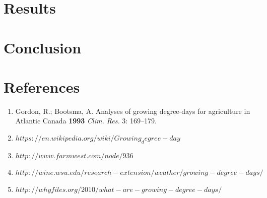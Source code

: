\documentclass{article}
\begin{document}
\section{ \bf Results}





\section{Conclusion}


\section{References}
%
\begin{enumerate}
\item Gordon, R.; Bootsma, A. Analyses of growing degree-days for agriculture in Atlantic Canada \textbf{1993} \textit{Clim. Res.} 3: 169--179.
\item \href{url}{$https://en.wikipedia.org/wiki/Growing_degree-day$}
\item \href{url}{$http://www.farmwest.com/node/936$}
\item \href{url}{$http://wine.wsu.edu/research-extension/weather/growing-degree-days/$}
\item \href{url}{$http://whyfiles.org/2010/what-are-growing-degree-days/$}
\end{enumerate}
\end{document}
